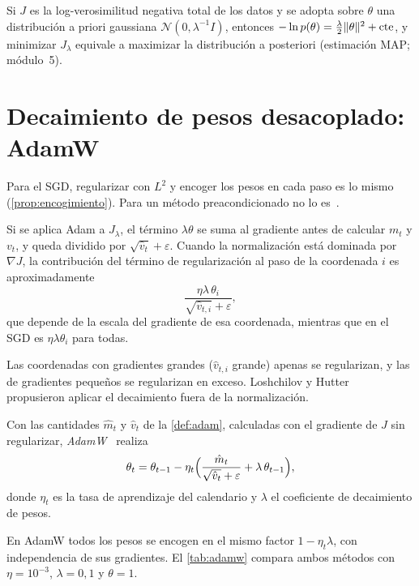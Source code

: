\begin{observacion}
Si $J$ es la log-verosimilitud negativa total de los datos y se adopta sobre $\theta$ una distribución a priori gaussiana $\mathcal{N}(0,\lambda^{-1}I)$, entonces $-\ln p(\theta)=\frac{\lambda}{2}\lVert\theta\rVert^{2}+\text{cte}$, y minimizar $J_\lambda$ equivale a maximizar la distribución a posteriori (estimación MAP; módulo~5).
\end{observacion}

\section{Decaimiento de pesos desacoplado: AdamW}

Para el SGD, regularizar con $L^{2}$ y encoger los pesos en cada paso es lo mismo (\cref{prop:encogimiento}). Para un método preacondicionado no lo es~\cite[§2]{adamw}.

\begin{observacion}\label{obs:adam-l2}
Si se aplica Adam a $J_\lambda$, el término $\lambda\theta$ se suma al gradiente antes de calcular $m_t$ y $v_t$, y queda dividido por $\sqrt{\hat v_t}+\varepsilon$. Cuando la normalización está dominada por $\nabla J$, la contribución del término de regularización al paso de la coordenada $i$ es aproximadamente
\[
\frac{\eta\lambda\,\theta_i}{\sqrt{\hat v_{t,i}}+\varepsilon},
\]
que depende de la escala del gradiente de esa coordenada, mientras que en el SGD es $\eta\lambda\theta_i$ para todas.
\end{observacion}

Las coordenadas con gradientes grandes ($\hat v_{t,i}$ grande) apenas se regularizan, y las de gradientes pequeños se regularizan en exceso. Loshchilov y Hutter~\cite{adamw} propusieron aplicar el decaimiento fuera de la normalización.

\begin{definicion}[AdamW]\label{def:adamw}
Con las cantidades $\hat m_t$ y $\hat v_t$ de la \cref{def:adam}, calculadas con el gradiente de $J$ sin regularizar, \emph{AdamW}~\cite[algoritmo~2]{adamw} realiza
\[
\theta_t=\theta_{t-1}-\eta_t\Bigl(\frac{\hat m_t}{\sqrt{\hat v_t}+\varepsilon}+\lambda\,\theta_{t-1}\Bigr),
\]
donde $\eta_t$ es la tasa de aprendizaje del calendario y $\lambda$ el coeficiente de decaimiento de pesos.
\end{definicion}

En AdamW todos los pesos se encogen en el mismo factor $1-\eta_t\lambda$, con independencia de sus gradientes. El \cref{tab:adamw} compara ambos métodos con $\eta=10^{-3}$, $\lambda=0{,}1$ y $\theta=1$.

